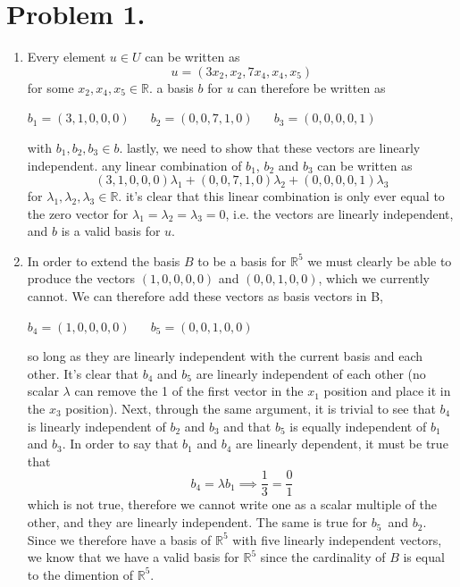 \documentclass[a4paper,11pt,norsk]{article}
\begin{document}


\section*{Problem 1.}
\begin{enumerate}
    \item Every element $u \in U$ can be written as 
        $$u = (3x_2, x_2, 7x_4, x_4, x_5)$$
        for some $x_2, x_4, x_5 \in \mathbb{R}$. a basis $b$ for $u$ can therefore be written as
        \begin{center}
            $b_1 = (3, 1, 0, 0, 0)\:\:\:$ $\:\:\:b_2 = (0, 0, 7, 1, 0)\:\:\:$ $\:\:\:b_3 = (0, 0, 0, 0, 1)$
        \end{center}
        with $b_1, b_2, b_3 \in b$.
        lastly, we need to show that these vectors are linearly independent. any linear combination of $b_1$, $b_2$ and $b_3$ can be 
        written as 
        $$(3, 1, 0, 0, 0)\lambda_1 + (0, 0, 7, 1, 0)\lambda_2 + (0, 0, 0, 0, 1)\lambda_3$$
        for $\lambda_1, \lambda_2, \lambda_3 \in \mathbb{R}$. it's clear that this linear combination is only ever equal to the 
        zero vector for $\lambda_1 = \lambda_2 = \lambda_3 = 0$, i.e. the vectors are linearly independent, and $b$ is a valid basis for $u$.

    \item In order to extend the basis $B$ to be a basis for $\mathbb{R}^5$ we must clearly be able to produce the vectors $(1, 0, 0, 0, 0)$ and 
        $(0, 0, 1, 0, 0)$, which we currently cannot. We can therefore add these vectors as basis vectors in B, 
        \begin{center}
            $b_4 = (1, 0, 0, 0, 0)\:\:\:\:\:\:$ $b_5 = (0, 0, 1, 0, 0)$
        \end{center}
        so long as they are linearly independent with
        the current basis and each other. It's clear that $b_4$ and $b_5$ are linearly independent of each other (no scalar $\lambda$ can 
        remove the 1 of the first vector in the $x_1$ position and place it in the $x_3$ position). Next, through the same argument,
        it is trivial to see that $b_4$ is linearly independent of $b_2$ and $b_3$ and that $b_5$ is equally independent of $b_1$ and $b_3$.
        In order to say that $b_1$ and $b_4$ are linearly dependent, it must be true that
        $$b_4 = \lambda b_1 \implies \frac{1}{3} = \frac{0}{1}$$
        which is not true, therefore we cannot write one as a scalar multiple of the other, and they are linearly independent. The same is true for 
        $b_5$ and $b_2$. Since we therefore have a basis of $\mathbb{R}^5$ with five linearly independent vectors, we know that we have a valid basis for
        $\mathbb{R}^5$ since the cardinality of $B$ is equal to the dimention of $\mathbb{R}^5$.
\end{enumerate}
\end{document}

